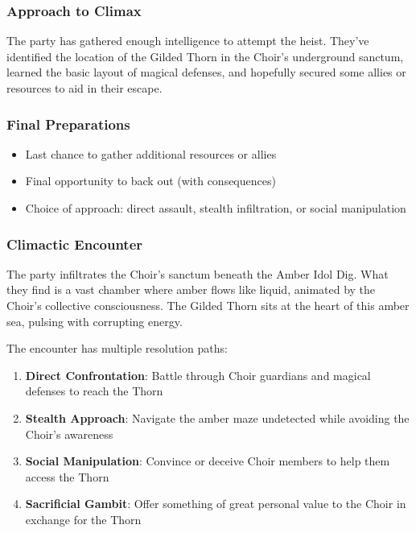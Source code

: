 \documentclass[11pt]{article}
\begin{document}
\subsubsection*{Approach to Climax}

The party has gathered enough intelligence to attempt the heist. They've identified the location of the Gilded Thorn in the Choir's underground sanctum, learned the basic layout of magical defenses, and hopefully secured some allies or resources to aid in their escape.

\subsubsection*{Final Preparations}

\begin{itemize}
  \item Last chance to gather additional resources or allies
  \item Final opportunity to back out (with consequences)
  \item Choice of approach: direct assault, stealth infiltration, or social manipulation
\end{itemize}

\subsubsection*{Climactic Encounter}

The party infiltrates the Choir's sanctum beneath the Amber Idol Dig. What they find is a vast chamber where amber flows like liquid, animated by the Choir's collective consciousness. The Gilded Thorn sits at the heart of this amber sea, pulsing with corrupting energy.

The encounter has multiple resolution paths:
\begin{enumerate}
  \item \textbf{Direct Confrontation}: Battle through Choir guardians and magical defenses to reach the Thorn
  \item \textbf{Stealth Approach}: Navigate the amber maze undetected while avoiding the Choir's awareness
  \item \textbf{Social Manipulation}: Convince or deceive Choir members to help them access the Thorn
  \item \textbf{Sacrificial Gambit}: Offer something of great personal value to the Choir in exchange for the Thorn
\end{enumerate}
\end{document}
